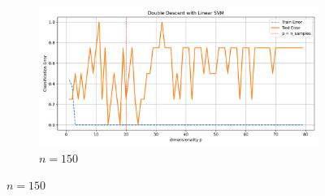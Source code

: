 \documentclass{article}
\begin{document}
\begin{figure}[htb]
\begin{subfigure}[b]{\imgwidth}
  \end{subfigure}%
  \hfill
  \begin{subfigure}[b]{\imgwidth}
    \includegraphics[width=\linewidth]{img_qq/risk_curve_n140.png}
    \caption{$n=150$}\label{fig:2l1}
  \end{subfigure}

  \medskip


\end{figure}
\end{document}
